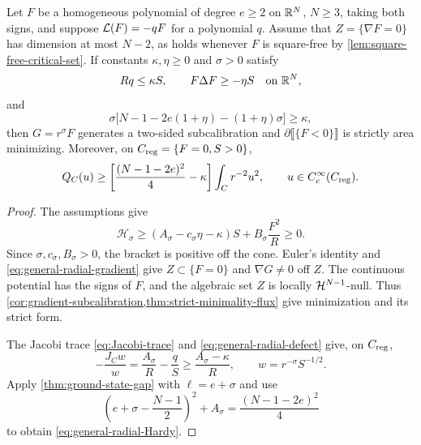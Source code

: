 \begin{proposition}
\label{prop:general-radial-existence}
Let \(F\) be a homogeneous polynomial of degree \(e\ge2\) on
\(\mathbb R^N\), \(N\ge3\), taking both signs,
and suppose \(\mathcal L(F)=-qF\) for a polynomial \(q\).
Assume that \(Z=\{\nabla F=0\}\) has dimension at most \(N-2\),
as holds whenever \(F\) is square-free by
\cref{lem:square-free-critical-set}.
If constants \(\kappa,\eta\ge0\) and \(\sigma>0\) satisfy
\begin{equation}\label{eq:general-radial-comparisons}
 Rq\le\kappa S,\qquad F\Delta F\ge-\eta S
 \quad\hbox{on }\mathbb R^N,
\end{equation}
and
\begin{equation}\label{eq:general-radial-sufficient}
 \sigma\bigl[N-1-2e(1+\eta)-(1+\eta)\sigma\bigr]\ge\kappa,
\end{equation}
then \(G=r^\sigma F\) generates a two-sided subcalibration and
\(\partial\llbracket\{F<0\}\rrbracket\) is strictly area minimizing.
Moreover, on \(C_{\mathrm{reg}}=\{F=0,S>0\}\),
\begin{equation}\label{eq:general-radial-Hardy}
 Q_C(u)\ge
 \left[\frac{(N-1-2e)^2}{4}-\kappa\right]
 \int_Cr^{-2}u^2,
 \qquad u\in C_c^\infty(C_{\mathrm{reg}}).
\end{equation}
\end{proposition}

\begin{proof}
The assumptions give
\[
 \mathscr H_\sigma\ge
 (A_\sigma-c_\sigma\eta-\kappa)S
 +B_\sigma\frac{F^2}{R}\ge0.
\]
Since \(\sigma,c_\sigma,B_\sigma>0\), the bracket is positive off
the cone. Euler's identity and \eqref{eq:general-radial-gradient}
give \(Z\subset\{F=0\}\) and \(\nabla G\ne0\) off \(Z\).
The continuous potential has the signs of \(F\), and the algebraic
set \(Z\) is locally \(\mathcal H^{N-1}\)-null. Thus
\cref{cor:gradient-subcalibration,thm:strict-minimality-flux}
give minimization and its strict form.

The Jacobi trace \eqref{eq:Jacobi-trace} and
\eqref{eq:general-radial-defect} give, on \(C_{\mathrm{reg}}\),
\begin{equation}\label{eq:general-radial-Jacobi}
 -\frac{J_Cw}{w}=\frac{A_\sigma}{R}-\frac qS
 \ge\frac{A_\sigma-\kappa}{R},
 \qquad w=r^{-\sigma}S^{-1/2}.
\end{equation}
Apply \cref{thm:ground-state-gap} with \(\ell=e+\sigma\) and use
\[
 \left(e+\sigma-\frac{N-1}{2}\right)^2+A_\sigma
 =\frac{(N-1-2e)^2}{4}
\]
to obtain \eqref{eq:general-radial-Hardy}.
\end{proof}

